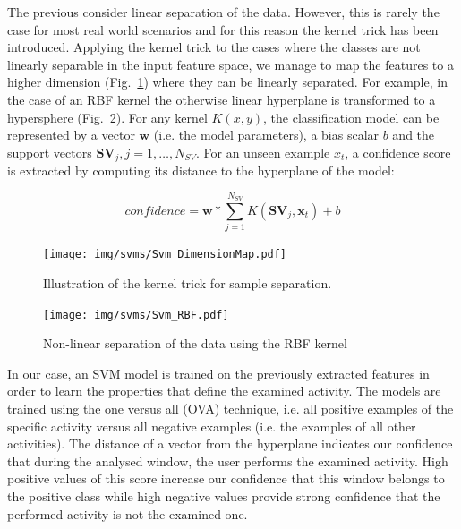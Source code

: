 The previous consider linear separation of the data. However, this is
rarely the case for most real world scenarios and for this reason the
kernel trick has been introduced. Applying the kernel trick to the
cases where the classes are not linearly separable in the input
feature space, we manage to map the features to a higher dimension
(Fig.~\ref{fig:svm_highDim}) where they can be linearly separated. For
example, in the case of an RBF kernel the otherwise linear hyperplane
is transformed to a hypersphere (Fig.~\ref{fig:svm_rbf}). For any
kernel $K(x,y)$, the classification model can be represented by a
vector $\textbf{w}$ (i.e. the model parameters), a bias scalar $b$ and
the support vectors $\mathbf{SV}_j, j=1,\ldots,N_{SV}$. For an unseen
example $x_t$, a confidence score is extracted by computing its
distance to the hyperplane of the model:

\begin{equation}\label{Eq:SVMdecision}
  confidence = \mathbf{w}*\sum_{j=1}^{N_{SV}}{K(\mathbf{SV}_j,\mathbf{x}_t)}+b
\end{equation}

\begin{figure}[h]
\centering
  \texttt{[image: img/svms/Svm\_DimensionMap.pdf]}
  \caption{Illustration of the kernel trick for sample separation.}
  \label{fig:svm_highDim}
\end{figure}

\begin{figure}[h]
\centering
  \texttt{[image: img/svms/Svm\_RBF.pdf]}
  \caption{Non-linear separation of the data using the RBF kernel}
  \label{fig:svm_rbf}
\end{figure}


In our case, an SVM model is trained on the previously extracted
features in order to learn the properties that define the examined
activity. The models are trained using the one versus all (OVA)
technique, i.e. all positive examples of the specific activity versus
all negative examples (i.e. the examples of all other activities). The
distance of a vector from the hyperplane indicates our confidence that
during the analysed window, the user performs the examined
activity. High positive values of this score increase our confidence
that this window belongs to the positive class while high negative
values provide strong confidence that the performed activity is not
the examined one.



